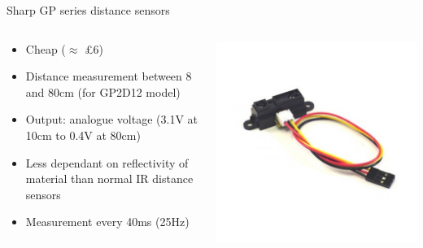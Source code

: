 \documentclass[compress]{beamer}
\begin{document}
\begin{frame}{Sharp GP series distance sensors}

    \begin{columns}
        \begin{column}{0.5\linewidth}

            \begin{itemize}

                \item Cheap ($\approx$ £6)
                \item Distance measurement between 8 and 80cm (for GP2D12 model)
                \item Output: analogue voltage (3.1V at 10cm to 0.4V at 80cm)
                \item Less dependant on reflectivity of material than normal IR distance
                    sensors
                \item Measurement every 40ms (25Hz)
            \end{itemize}

        \end{column}
        \begin{column}{0.5\linewidth}
            \begin{center}
                \includegraphics[width=0.9\linewidth]{sharp_ir}
            \end{center}
        \end{column}
    \end{columns}

\end{frame}
\end{document}
